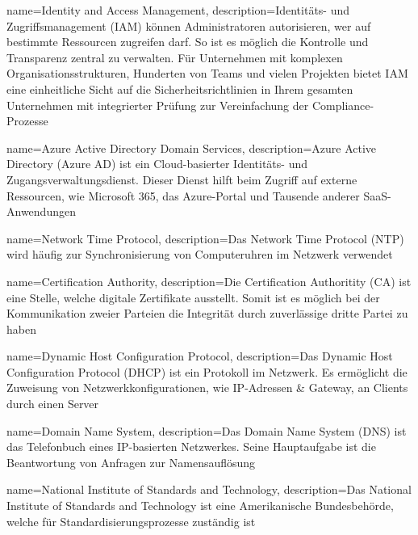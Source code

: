 


{
    name=Identity and Access Management,
    description={Identitäts- und Zugriffsmanagement (IAM) können Administratoren autorisieren, wer auf bestimmte Ressourcen zugreifen darf. So ist es möglich die Kontrolle und Transparenz zentral zu verwalten. Für Unternehmen mit komplexen Organisationsstrukturen, Hunderten von Teams und vielen Projekten bietet IAM eine einheitliche Sicht auf die Sicherheitsrichtlinien in Ihrem gesamten Unternehmen mit integrierter Prüfung zur Vereinfachung der Compliance-Prozesse}
}

{
    name=Azure Active Directory Domain Services,
    description={Azure Active Directory (Azure AD) ist ein Cloud-basierter Identitäts- und Zugangsverwaltungsdienst. Dieser Dienst hilft beim Zugriff auf externe Ressourcen, wie Microsoft 365, das Azure-Portal und Tausende anderer SaaS-Anwendungen}
}

{
    name=Network Time Protocol,
    description={Das Network Time Protocol (NTP) wird häufig zur Synchronisierung von Computeruhren im Netzwerk verwendet}
}

{
    name=Certification Authority,
    description={Die Certification Authoritity (CA) ist eine Stelle, welche digitale Zertifikate ausstellt. Somit ist es möglich bei der Kommunikation zweier Parteien die Integrität durch zuverlässige dritte Partei zu haben}
}

{
    name=Dynamic Host Configuration Protocol,
    description={Das Dynamic Host Configuration Protocol (DHCP) ist ein Protokoll im Netzwerk. Es ermöglicht die Zuweisung von Netzwerkkonfigurationen, wie IP-Adressen \& Gateway, an Clients durch einen Server}
}

{
    name=Domain Name System,
    description={Das Domain Name System (DNS) ist das Telefonbuch eines IP-basierten Netzwerkes. Seine Hauptaufgabe ist die Beantwortung von Anfragen zur Namensauflösung}
}

{
    name=National Institute of Standards and Technology,
    description={Das National Institute of Standards and Technology ist eine Amerikanische Bundesbehörde, welche für Standardisierungsprozesse zuständig ist}
}

